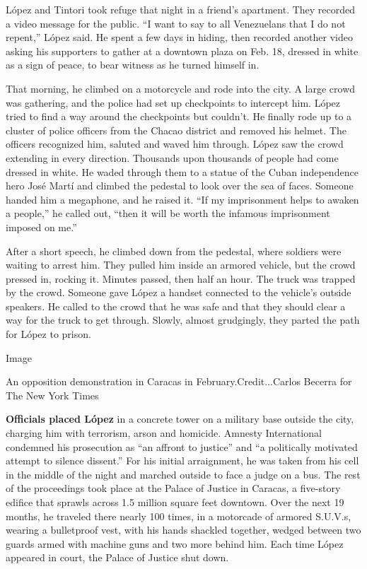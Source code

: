 López and Tintori took refuge that night in a friend's apartment. They
recorded a video message for the public. ``I want to say to all
Venezuelans that I do not repent,'' López said. He spent a few days in
hiding, then recorded another video asking his supporters to gather at a
downtown plaza on Feb. 18, dressed in white as a sign of peace, to bear
witness as he turned himself in.

That morning, he climbed on a motorcycle and rode into the city. A large
crowd was gathering, and the police had set up checkpoints to intercept
him. López tried to find a way around the checkpoints but couldn't. He
finally rode up to a cluster of police officers from the Chacao district
and removed his helmet. The officers recognized him, saluted and waved
him through. López saw the crowd extending in every direction. Thousands
upon thousands of people had come dressed in white. He waded through
them to a statue of the Cuban independence hero José Martí and climbed
the pedestal to look over the sea of faces. Someone handed him a
megaphone, and he raised it. ``If my imprisonment helps to awaken a
people,'' he called out, ``then it will be worth the infamous
imprisonment imposed on me.''

After a short speech, he climbed down from the pedestal, where soldiers
were waiting to arrest him. They pulled him inside an armored vehicle,
but the crowd pressed in, rocking it. Minutes passed, then half an hour.
The truck was trapped by the crowd. Someone gave López a handset
connected to the vehicle's outside speakers. He called to the crowd that
he was safe and that they should clear a way for the truck to get
through. Slowly, almost grudgingly, they parted the path for López to
prison.

Image

An opposition demonstration in Caracas in February.Credit...Carlos
Becerra for The New York Times

\textbf{Officials placed López} in a concrete tower on a military base
outside the city, charging him with terrorism, arson and homicide.
Amnesty International condemned his prosecution as ``an affront to
justice'' and ``a politically motivated attempt to silence dissent.''
For his initial arraignment, he was taken from his cell in the middle of
the night and marched outside to face a judge on a bus. The rest of the
proceedings took place at the Palace of Justice in Caracas, a five-story
edifice that sprawls across 1.5 million square feet downtown. Over the
next 19 months, he traveled there nearly 100 times, in a motorcade of
armored S.U.V.s, wearing a bulletproof vest, with his hands shackled
together, wedged between two guards armed with machine guns and two more
behind him. Each time López appeared in court, the Palace of Justice
shut down.

